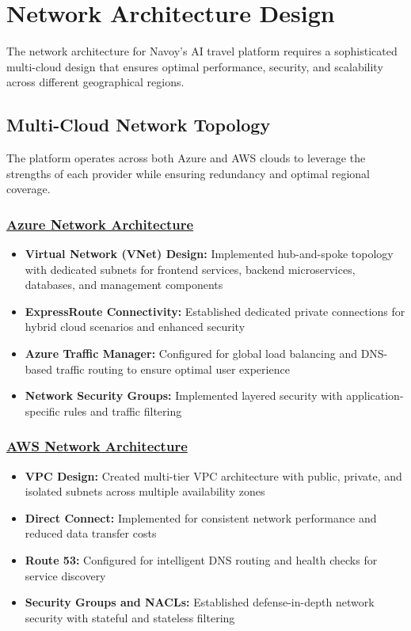 \section{Network Architecture Design}
The network architecture for Navoy's AI travel platform requires a sophisticated multi-cloud design that ensures optimal performance, security, and scalability across different geographical regions.

\subsection{Multi-Cloud Network Topology}
The platform operates across both Azure and AWS clouds to leverage the strengths of each provider while ensuring redundancy and optimal regional coverage.

\subsubsection*{\underline{Azure Network Architecture}}
\begin{itemize}
    \item \textbf{Virtual Network (VNet) Design:} Implemented hub-and-spoke topology with dedicated subnets for frontend services, backend microservices, databases, and management components
    \item \textbf{ExpressRoute Connectivity:} Established dedicated private connections for hybrid cloud scenarios and enhanced security
    \item \textbf{Azure Traffic Manager:} Configured for global load balancing and DNS-based traffic routing to ensure optimal user experience
    \item \textbf{Network Security Groups:} Implemented layered security with application-specific rules and traffic filtering
\end{itemize}

\subsubsection*{\underline{AWS Network Architecture}}
\begin{itemize}
    \item \textbf{VPC Design:} Created multi-tier VPC architecture with public, private, and isolated subnets across multiple availability zones
    \item \textbf{Direct Connect:} Implemented for consistent network performance and reduced data transfer costs
    \item \textbf{Route 53:} Configured for intelligent DNS routing and health checks for service discovery
    \item \textbf{Security Groups and NACLs:} Established defense-in-depth network security with stateful and stateless filtering
\end{itemize}

